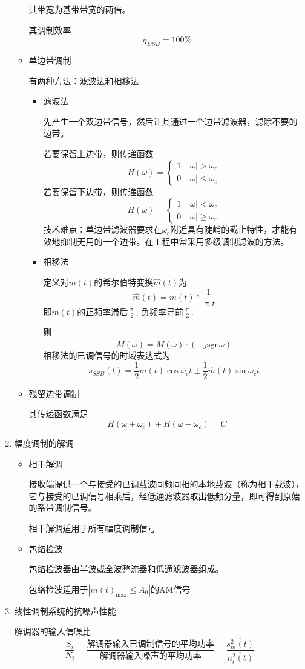 \documentclass[UTF8]{ctexrep}
\newcommand{\ext}{\displaystyle}
\def\pth#1{\left( {#1}\right)}
\begin{document}
\begin{enumerate}
\begin{itemize}
其带宽为基带带宽的两倍。\par
其调制效率
\[\eta_{DSB}=100\%\]
\item 单边带调制\par
有两种方法：滤波法和相移法
\begin{itemize}
\item 滤波法\par
先产生一个双边带信号，然后让其通过一个边带滤波器，滤除不要的边带。\par
若要保留上边带，则传递函数
\[H(\omega)=\begin{cases}1&|\omega|>\omega_c\\0&|\omega|\leq\omega_c\end{cases}\]
若要保留下边带，则传递函数
\[H(\omega)=\begin{cases}1&|\omega|<\omega_c\\0&|\omega|\geq\omega_c\end{cases}\]
技术难点：单边带滤波器要求在$\omega_c$附近具有陡峭的截止特性，才能有效地抑制无用的一个边带。在工程中常采用多级调制滤波的方法。
\item 相移法\par
定义对$m(t)$的希尔伯特变换$\hat{m}(t)$为
\[\hat{m}(t)=m(t)* \frac{1}{\uppi t}\]
即$m(t)$的正频率滞后$\ext\frac{\uppi}{2}$, 负频率导前$\ext\frac{\uppi}{2}$.\par
则
\[\hat{M}(\omega)=M(\omega)\cdot \pth{-j\mathrm{sgn}\omega}\]
相移法的已调信号的时域表达式为
\[s_{SSB}(t)=\frac{1}{2}m(t)\cos\omega_ct\pm \frac{1}{2}\hat{m}(t)\sin\omega_ct\]
\end{itemize}
\item 残留边带调制\par
其传递函数满足
\[H\pth{\omega+\omega_c}+H\pth{\omega-\omega_c}=C\]
\end{itemize}
\item 幅度调制的解调
\begin{itemize}
\item 相干解调\par
接收端提供一个与接受的已调载波同频同相的本地载波（称为相干载波），它与接受的已调信号相乘后，经低通滤波器取出低频分量，即可得到原始的系带调制信号。\par
相干解调适用于所有幅度调制信号
\item 包络检波\par
包络检波器由半波或全波整流器和低通滤波器组成。\par
包络检波适用于$|m(t)_{\max}\leq A_0|$的AM信号
\end{itemize}
\item 线性调制系统的抗噪声性能\par
解调器的输入信噪比
\[\frac{S_i}{N_i}=\frac{\text{解调器输入已调制信号的平均功率}}{\text{解调器输入噪声的平均功率}}=\frac{\overline{s_m^2(t)}}{\overline{n_i^2(t)}}\]


\end{enumerate}
\end{document}

